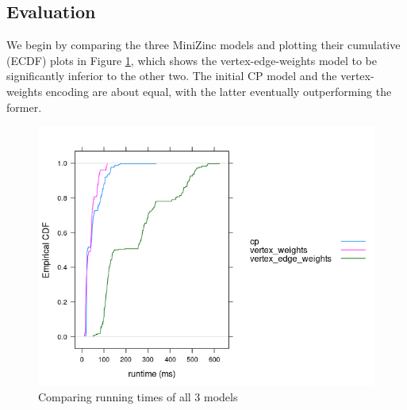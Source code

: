 \documentclass{article}
\theoremstyle{definition}
\begin{document}
\subsection{Evaluation}
We begin by comparing the three MiniZinc models and plotting their cumulative (ECDF) plots in Figure \ref{fig:comparison}, which shows the vertex-edge-weights model to be significantly inferior to the other two. The initial CP model and the vertex-weights encoding are about equal, with the latter eventually outperforming the former.
\begin{figure}
  \includegraphics[scale=0.75]{comparison.png}
  \caption{Comparing running times of all 3 models}
  \label{fig:comparison}
\end{figure}
\end{document}

